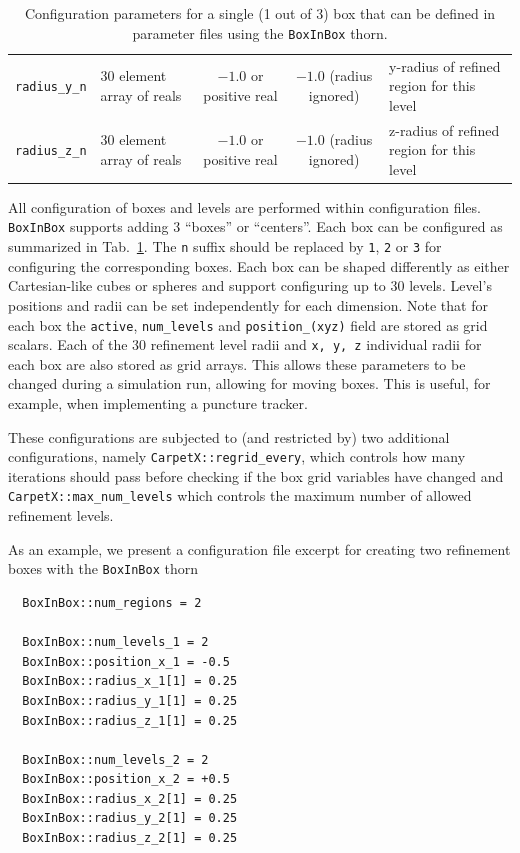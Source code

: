 \begin{table}[ht]
\begin{tabular*}{\linewidth}{cp{7em}ccp{9em}}
    \texttt{radius\_y\_n}   & 30 element array of reals & \parbox[t]{6em}{\centering$-1.0$ or positive real}                & \parbox[t]{10em}{\centering$-1.0$\\(radius ignored)} & y-radius of refined region for this level \\
    \texttt{radius\_z\_n}   & 30 element array of reals & \parbox[t]{6em}{\centering$-1.0$ or positive real}                & \parbox[t]{10em}{\centering$-1.0$\\(radius ignored)} & z-radius of refined region for this level \\\hline\hline
  \end{tabular*}
  \caption{Configuration parameters for a single (1 out of 3) box that can be defined in parameter files using the \texttt{BoxInBox} thorn.}
  \label{tab:box_config}
\end{table}

All configuration of boxes and levels are performed within configuration files. \texttt{BoxInBox} supports adding 3 ``boxes'' or ``centers''. Each box can be configured as summarized in Tab.~\ref{tab:box_config}. The \texttt{n} suffix should be replaced by \texttt{1}, \texttt{2} or \texttt{3} for configuring the corresponding boxes. Each box can be shaped differently as either Cartesian-like cubes or spheres and support configuring up to 30 levels. Level's positions and radii can be set independently for each dimension. Note that for each box the \texttt{active}, \texttt{num\_levels} and \texttt{position\_(xyz)} field are stored as grid scalars. Each of the 30 refinement level radii and \texttt{x, y, z} individual radii for each box are also stored as grid arrays. This allows these parameters to be changed during a simulation run, allowing for moving boxes. This is useful, for example, when implementing a puncture tracker. 

These configurations are subjected to (and restricted by) two additional \CarpetX\space configurations, namely \texttt{CarpetX::regrid\_every}, which controls how many iterations should pass before checking if the box grid variables have changed and \texttt{CarpetX::max\_num\_levels} which controls the maximum number of allowed refinement levels.

As an example, we present a configuration file excerpt for creating two refinement boxes with the \texttt{BoxInBox} thorn

\begin{verbatim}
  BoxInBox::num_regions = 2

  BoxInBox::num_levels_1 = 2
  BoxInBox::position_x_1 = -0.5
  BoxInBox::radius_x_1[1] = 0.25
  BoxInBox::radius_y_1[1] = 0.25
  BoxInBox::radius_z_1[1] = 0.25

  BoxInBox::num_levels_2 = 2
  BoxInBox::position_x_2 = +0.5
  BoxInBox::radius_x_2[1] = 0.25
  BoxInBox::radius_y_2[1] = 0.25
  BoxInBox::radius_z_2[1] = 0.25
\end{verbatim}

